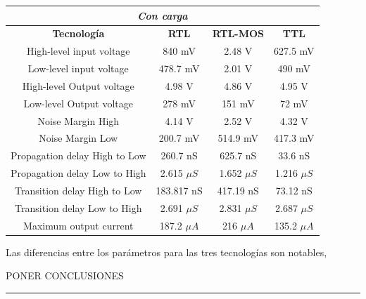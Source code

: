 \begin{table}[H]
\centering
\begin{tabular}{c|ccc}
\hline
\multicolumn{4}{|c|}{\textit{Con carga}}                                                                         \\ \hline
\multicolumn{1}{|c|}{\textbf{Tecnología}} & \textbf{RTL}  & \textbf{RTL-MOS} & \multicolumn{1}{c|}{\textbf{TTL}} \\ \hline
High-level input voltage                  & 840 mV        & 2.48 V           & 627.5 mV                          \\
Low-level input voltage                   & 478.7 mV      & 2.01 V         &    490 mV                         \\
High-level Output voltage                 & 4.98 V        & 4.86 V          & 4.95 V                            \\
Low-level Output voltage                  & 278 mV        & 151 mV           & 72 mV                             \\
Noise Margin High                         & 4.14 V        & 2.52 V           & 4.32 V                            \\
Noise Margin Low                          & 200.7 mV      & 514.9 mV         & 417.3 mV                          \\
Propagation delay High to Low             & 260.7 nS      & 625.7 nS         & 33.6 nS                           \\
Propagation delay Low to High             & 2.615 $\mu S$ & 1.652 $\mu S$    & 1.216 $\mu S$                     \\
Transition delay High to Low              & 183.817 nS    & 417.19 nS        & 73.12 nS                          \\
Transition delay Low to High              & 2.691 $\mu S$ & 2.831 $\mu S$    & 2.687 $\mu S$                     \\
Maximum output current                    &  187.2 $\mu A$             &     216 $\mu A$             &   135.2 $\mu A$                               
\end{tabular}
\end{table}
 

Las diferencias entre los parámetros para las tres tecnologías son notables,
{\begin{center}\color{red} \begin{huge}
PONER CONCLUSIONES \end{huge} \rule{\linewidth}{0.5mm}\end{center} }